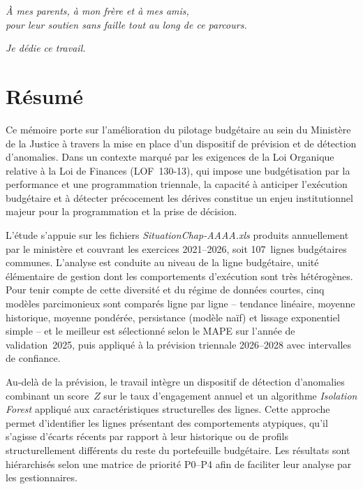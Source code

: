 \documentclass[12pt,a4paper]{article}
\begin{document}
\begin{center}
\vspace*{3cm}

\textit{\`A mes parents, \`a mon fr\`ere et \`a mes amis,}\\[6pt]
\textit{pour leur soutien sans faille tout au long de ce parcours.}

\vspace{1.2cm}

\textit{Je d\'edie ce travail.}

\end{center}

\newpage

\section*{R\'esum\'e}

Ce m\'emoire porte sur l'am\'elioration du pilotage budg\'etaire au sein du Minist\`ere de la Justice \`a travers la mise en place d'un dispositif de pr\'evision et de d\'etection d'anomalies. Dans un contexte marqu\'e par les exigences de la Loi Organique relative \`a la Loi de Finances (LOF~130-13), qui impose une budg\'etisation par la performance et une programmation triennale, la capacit\'e \`a anticiper l'ex\'ecution budg\'etaire et \`a d\'etecter pr\'ecocement les d\'erives constitue un enjeu institutionnel majeur pour la programmation et la prise de d\'ecision.

L'\'etude s'appuie sur les fichiers \textit{SituationChap-AAAA.xls} produits annuellement par le minist\`ere et couvrant les exercices 2021--2026, soit 107~lignes budg\'etaires communes. L'analyse est conduite au niveau de la ligne budg\'etaire, unit\'e \'el\'ementaire de gestion dont les comportements d'ex\'ecution sont tr\`es h\'et\'erog\`enes. Pour tenir compte de cette diversit\'e et du r\'egime de donn\'ees courtes, cinq mod\`eles parcimonieux sont compar\'es ligne par ligne -- tendance lin\'eaire, moyenne historique, moyenne pond\'er\'ee, persistance (mod\`ele na\"if) et lissage exponentiel simple -- et le meilleur est s\'electionn\'e selon le MAPE sur l'ann\'ee de validation~2025, puis appliqu\'e \`a la pr\'evision triennale 2026--2028 avec intervalles de confiance.

Au-del\`a de la pr\'evision, le travail int\`egre un dispositif de d\'etection d'anomalies combinant un score~$Z$ sur le taux d'engagement annuel et un algorithme \textit{Isolation Forest} appliqu\'e aux caract\'eristiques structurelles des lignes. Cette approche permet d'identifier les lignes pr\'esentant des comportements atypiques, qu'il s'agisse d'\'ecarts r\'ecents par rapport \`a leur historique ou de profils structurellement diff\'erents du reste du portefeuille budg\'etaire. Les r\'esultats sont hi\'erarchis\'es selon une matrice de priorit\'e P0--P4 afin de faciliter leur analyse par les gestionnaires.
\end{document}
